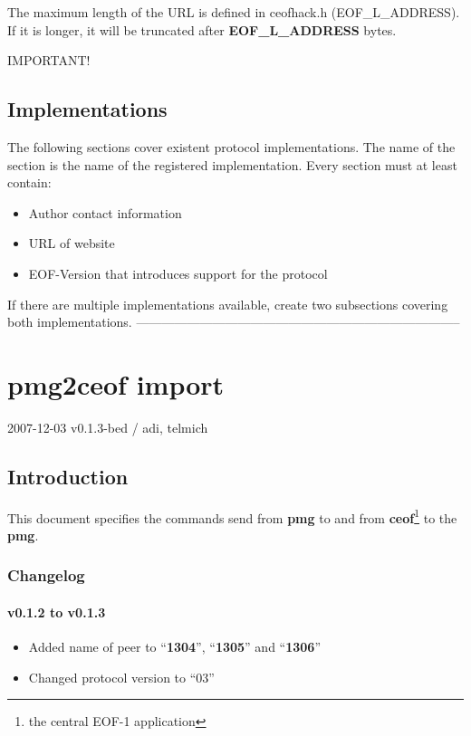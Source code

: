 \documentclass[12pt,a4paper]{book}
\begin{document}
The maximum length of the URL is defined in ceofhack.h (EOF\_L\_ADDRESS).
If it is longer, it will be truncated after \textbf{EOF\_L\_ADDRESS} bytes.

IMPORTANT!

\section{Implementations}
The following sections cover existent protocol implementations.
The name of the section is the name of the registered implementation.
Every section must at least contain:
\begin{itemize}
\item Author contact information
\item URL of website
\item EOF-Version that introduces support for the protocol
\end{itemize}

If there are multiple implementations available, create two subsections
covering both implementations.
 -----------------------------------------------------------------------------
\chapter{pmg2ceof import}

2007-12-03 v0.1.3-bed / adi, telmich

\section{Introduction}
This document specifies the commands send from \textbf{pmg} to and from
\textbf{ceof}\footnote{the central EOF-1 application} to the \textbf{pmg}.

\subsection{Changelog}
\subsubsection{v0.1.2 to v0.1.3}
\begin{itemize}
\item Added name of peer to "`\textbf{1304}"', "`\textbf{1305}"' and "`\textbf{1306}"'
\item Changed protocol version to "`03"'
\end{itemize}
\end{document}
